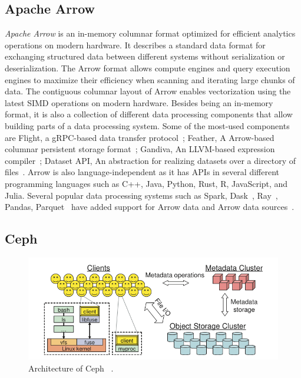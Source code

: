 \documentclass[12pt]{article}
\begin{document}
\subsection{Apache Arrow}
\textit{Apache Arrow} is an in-memory columnar format optimized for efficient analytics operations on modern hardware. It describes a standard data format for exchanging structured data between different systems without serialization or deserialization. The Arrow format allows compute engines and query execution engines to maximize their efficiency when scanning and iterating large chunks of data. The contiguous columnar layout of Arrow enables vectorization using the latest SIMD operations on modern hardware. Besides being an in-memory format, it is also a collection of different data processing components that allow building parts of a data processing system. Some of the most-used components are Flight, a gRPC-based data transfer protocol~\cite{flight}; Feather, A Arrow-based columnar persistent storage format~\cite{feather}; Gandiva, An LLVM-based expression compiler~\cite{gandiva}; Dataset API, An abstraction for realizing datasets over a directory of files~\cite{ArrowDatasetDocs}. Arrow is also language-independent as it has APIs in several different programming languages such as C++, Java, Python, Rust, R, JavaScript, and Julia. Several popular data processing systems such as Spark, Dask~\cite{Dask}, Ray~\cite{Ray}, Pandas, Parquet~\cite{parquet} have added support for Arrow data and Arrow data sources~\cite{jc2022skyhook}.

\subsection{Ceph}
\begin{figure}[h]
\centering
\includegraphics[width=\textwidth]{figs/cepharch.png}
\caption{Architecture of Ceph ~\cite{weil2006ceph}.}
\label{fig:ceph-arch}
\end{figure}
\end{document}

